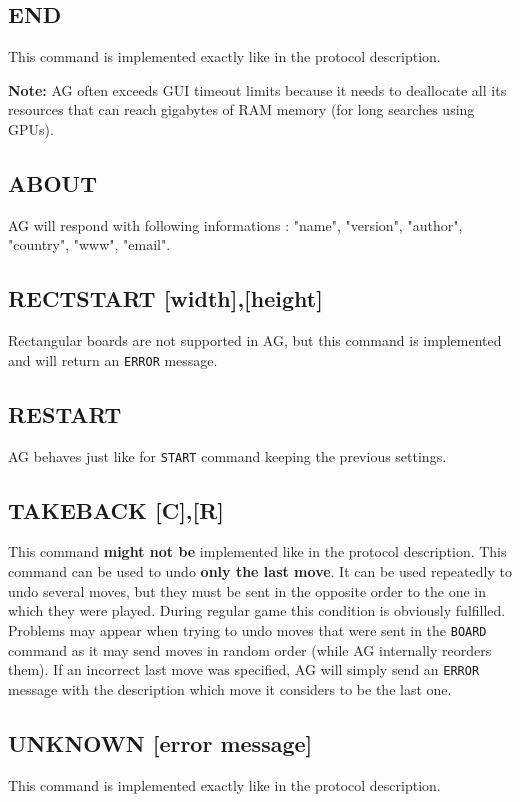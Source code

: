 \documentclass[12pt,a4paper]{article}
\begin{document}
\subsection{END}
\label{cmd_end}
This command is implemented exactly like in the protocol description.

\textbf{Note:} AG often exceeds GUI timeout limits because it needs to deallocate all its resources that can reach gigabytes of RAM memory (for long searches using GPUs).


\subsection{ABOUT}
\label{cmd_about}
AG will respond with following informations : "name", "version", "author", "country", "www", "email".


\subsection{RECTSTART [width],[height]}
\label{cmd_rectstart}
Rectangular boards are not supported in AG, but this command is implemented and will return an \texttt{ERROR} message.


\subsection{RESTART}
\label{cmd_restart}
AG behaves just like for \texttt{START} command keeping the previous settings.


\subsection{TAKEBACK [C],[R]}
\label{cmd_takeback}
This command \textbf{might not be} implemented like in the protocol description. This command can be used to undo \textbf{only the last move}. It can be used repeatedly to undo several moves, but they must be sent in the opposite order to the one in which they were played. During regular game this condition is obviously fulfilled. Problems may appear when trying to undo moves that were sent in the \texttt{BOARD} command as it may send moves in random order (while AG internally reorders them). If an incorrect last move was specified, AG will simply send an \texttt{ERROR} message with the description which move it considers to be the last one.


\subsection{UNKNOWN [error message]}
\label{cmd_unknown}
This command is implemented exactly like in the protocol description. 
\end{document}

